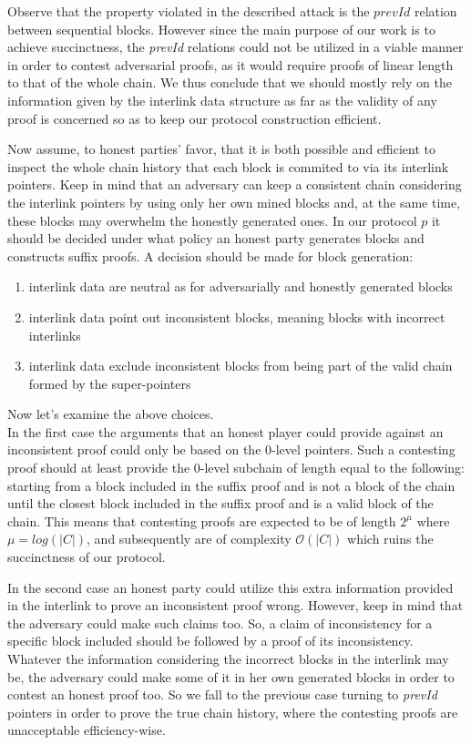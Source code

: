 Observe that the property violated in the described attack is the $prevId$ relation
between sequential blocks. However since the main purpose of our work is to achieve
succinctness, the \textit{prevId} relations could not be utilized in a viable manner
in order to contest adversarial proofs, as it would require proofs of linear length
to that of the whole chain.  We thus conclude that we should mostly rely on the
information given by the interlink data structure as far as the validity of any proof
is concerned so as to keep our protocol construction efficient.

Now assume, to honest parties' favor, that it is both possible and efficient to inspect
the whole chain history that each block is commited to via its interlink pointers. Keep
in mind that an adversary can keep a consistent chain considering the interlink pointers
by using only her own mined blocks and, at the same time, these blocks may overwhelm
the honestly generated ones. In our protocol $p$ it should be decided  under what policy
an honest party generates blocks and constructs suffix proofs. A decision should be made
for block generation:
\begin{enumerate}
\item interlink data are neutral as for adversarially and honestly generated blocks
\item interlink data point out inconsistent blocks, meaning blocks with incorrect
interlinks\item interlink data exclude inconsistent blocks from being part of the
valid chain formed by the super-pointers
\end{enumerate}
Now let's examine the above choices. \\
In the first case the arguments that an honest player could provide against an
inconsistent proof could only be based on the 0-level pointers. Such a contesting
proof should at least provide the 0-level subchain of length equal to the
following: starting from a block included in the suffix proof and is not a
block of the chain until the closest block included in the suffix proof and is
a valid block of the chain. This means that contesting proofs are expected to
be of length $2^\mu$ where $\mu = log(|C|)$, and subsequently are of complexity
$\mathcal{O}(|C|)$ which ruins the succinctness of our protocol.

In the second case an honest party could utilize this extra information provided
in the interlink to prove an inconsistent proof wrong. However, keep in mind that
the adversary could make such claims too. So, a claim of inconsistency for a
specific block included should be followed by a proof of its inconsistency.
Whatever the information considering the incorrect blocks in the interlink may
be, the adversary could make some of it in her own generated blocks in order to
contest an honest proof too. So we fall to the previous case turning to
\textit{prevId} pointers in order to prove the true chain history, where the
contesting proofs are unacceptable efficiency-wise.

